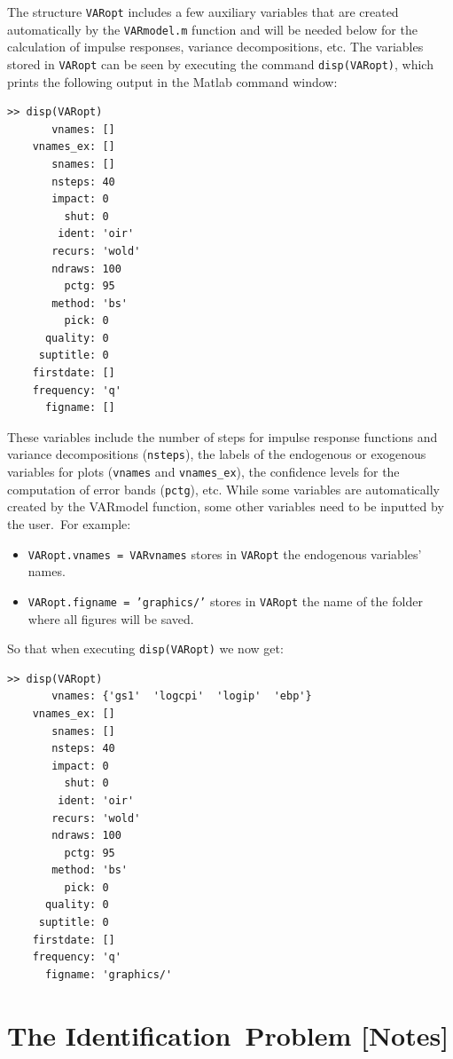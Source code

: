 \documentclass[10pt]{article}
\begin{document}
The structure \texttt{VARopt} includes a few auxiliary variables that are
created automatically by the \texttt{VARmodel.m} function and will be needed
below for the calculation of impulse responses, variance decompositions,
etc. The variables stored in \texttt{VARopt} can be seen by executing the
command \colorbox{script!80}{\texttt{disp(VARopt)}}, which prints the
following output in the Matlab command window:
\begin{verbatim}
>> disp(VARopt)
       vnames: []
    vnames_ex: []
       snames: []
       nsteps: 40
       impact: 0
         shut: 0
        ident: 'oir'
       recurs: 'wold'
       ndraws: 100
         pctg: 95
       method: 'bs'
         pick: 0
      quality: 0
     suptitle: 0
    firstdate: []
    frequency: 'q'
      figname: []
\end{verbatim}

These variables include the number of steps for impulse response functions
and variance decompositions (\texttt{nsteps}), the labels of the endogenous
or exogenous variables for plots (\texttt{vnames} and \texttt{vnames\_ex}),
the confidence levels for the computation of error bands (\texttt{pctg}),
etc. While some variables are automatically created by the VARmodel
function, some other variables need to be inputted by the user.\ For example:

\begin{itemize}
\item \colorbox{script!80}{\texttt{VARopt.vnames = VARvnames}} stores in
\texttt{VARopt} the endogenous variables' names.

\item \colorbox{script!80}{\texttt{VARopt.figname =
'graphics/'}} stores in \texttt{VARopt} the name of the folder where all
figures will be saved.
\end{itemize}

So that when executing \colorbox{script!80}{\texttt{disp(VARopt)}} we now
get:
\begin{verbatim}
>> disp(VARopt)
       vnames: {'gs1'  'logcpi'  'logip'  'ebp'}
    vnames_ex: []
       snames: []
       nsteps: 40
       impact: 0
         shut: 0
        ident: 'oir'
       recurs: 'wold'
       ndraws: 100
         pctg: 95
       method: 'bs'
         pick: 0
      quality: 0
     suptitle: 0
    firstdate: []
    frequency: 'q'
      figname: 'graphics/'
\end{verbatim}

\section{The Identification\ Problem {\color{note} {\protect\small {[Notes]}}%
}}
\end{document}
